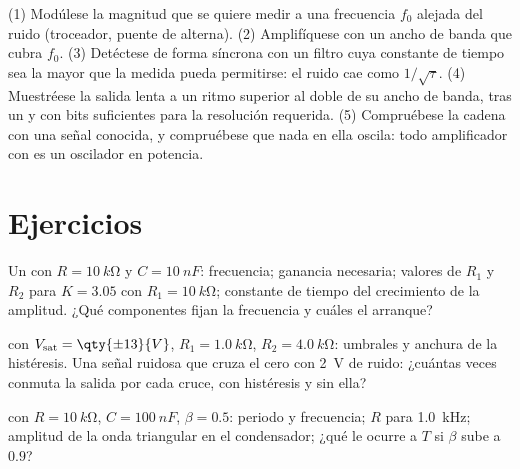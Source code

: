 \begin{method}\label{met:b2:feedback-oscillators:method}
(1) Modúlese la magnitud que se quiere medir a una frecuencia $f_0$
alejada del ruido (troceador, puente de alterna). (2) Amplifíquese con un
ancho de banda que cubra $f_0$. (3) Detéctese de forma síncrona con un
filtro cuya constante de tiempo sea la mayor que la medida pueda
permitirse: el ruido cae como $1/\sqrt\tau$. (4) Muestréese la salida
lenta a un ritmo superior al doble de su ancho de banda, tras un  y con bits suficientes para la resolución requerida.
(5) Compruébese la cadena con una señal conocida, y compruébese que nada
en ella oscila: todo amplificador con  es un oscilador en potencia.
\end{method}

\section{Ejercicios}

\begin{exercise}[$\star$]\label{exo:b2:feedback-oscillators:1}
Un  con $R = \qty{10}{k\ohm}$ y $C = \qty{10}{nF}$:
frecuencia; ganancia necesaria; valores de $R_1$ y $R_2$ para $K = 3.05$ con $R_1 =
\qty{10}{k\ohm}$; constante de tiempo del crecimiento de la amplitud. ¿Qué
componentes fijan la frecuencia y cuáles el arranque?
\end{exercise}

\begin{exercise}[$\star$]\label{exo:b2:feedback-oscillators:2}
 con $V_{\text{sat}} = \qty{\pm 13}{V}$, $R_1 = \qty{1.0}{k\ohm}$,
$R_2 = \qty{4.0}{k\ohm}$: umbrales y anchura de la histéresis. Una señal
ruidosa que cruza el cero con \qty{2}{V} de ruido: ¿cuántas veces conmuta
la salida por cada cruce, con histéresis y sin ella?
\end{exercise}

\begin{exercise}[$\star$]\label{exo:b2:feedback-oscillators:3}
 con $R = \qty{10}{k\ohm}$, $C = \qty{100}{nF}$, $\beta = 0.5$:
periodo y frecuencia; $R$ para \qty{1.0}{kHz}; amplitud de la onda
triangular en el condensador; ¿qué le ocurre a $T$ si $\beta$ sube a $0.9$?
\end{exercise}

